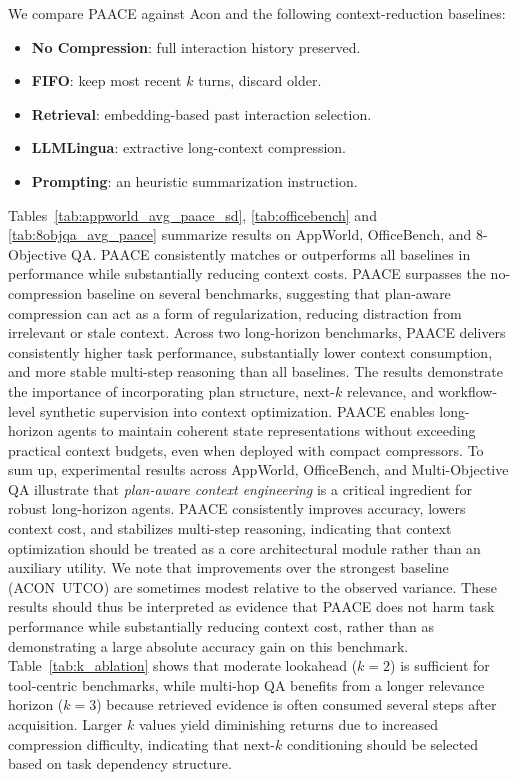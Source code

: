 \documentclass{article}
\theoremstyle{plain}
\theoremstyle{definition}
\theoremstyle{remark}
\begin{document}
We compare PAACE against Acon \citep{acon2025yu} and the following context-reduction baselines:

\begin{itemize}[topsep=0pt,itemsep=1pt,parsep=0pt,partopsep=0pt]
    \item \textbf{No Compression}: full interaction history preserved.
    \item \textbf{FIFO}: keep most recent $k$ turns, discard older.
    \item \textbf{Retrieval}: embedding-based past interaction selection.
    \item \textbf{LLMLingua}: extractive long-context compression.
    \item \textbf{Prompting}: an heuristic summarization instruction.
\end{itemize}




Tables~\ref{tab:appworld_avg_paace_sd}, \ref{tab:officebench} and \ref{tab:8objqa_avg_paace} summarize results on AppWorld, OfficeBench, and 8-Objective QA. PAACE consistently matches or outperforms all baselines in performance while substantially reducing context costs. PAACE surpasses the no-compression baseline on several benchmarks, suggesting that plan-aware compression can act as a form of regularization, reducing distraction from irrelevant or stale context. Across two long-horizon benchmarks, PAACE delivers consistently higher task performance, substantially lower context consumption, and more stable multi-step reasoning than all baselines. The results demonstrate the importance of incorporating plan structure, next-$k$ relevance, and workflow-level synthetic supervision into context optimization. PAACE enables long-horizon agents to maintain coherent state representations without exceeding practical context budgets, even when deployed with compact compressors. To sum up, experimental results across AppWorld, OfficeBench, and Multi-Objective QA illustrate that \emph{plan-aware context engineering} is a critical ingredient for robust long-horizon agents. PAACE consistently improves accuracy, lowers context cost, and stabilizes multi-step reasoning, indicating that context optimization should be treated as a core architectural module rather than an auxiliary utility. We note that improvements over the strongest baseline (ACON~UTCO) are sometimes modest relative to the observed variance. These results should thus be interpreted as evidence that PAACE does not harm task performance while substantially reducing context cost, rather than as demonstrating a large absolute accuracy gain on this benchmark. Table~\ref{tab:k_ablation} shows that moderate lookahead ($k=2$) is sufficient for tool-centric benchmarks, while multi-hop QA benefits from a longer relevance horizon ($k=3$) because retrieved evidence is often consumed several steps after acquisition. Larger $k$ values yield diminishing returns due to increased compression
difficulty, indicating that next-$k$ conditioning should be selected based on
task dependency structure.
\end{document}
